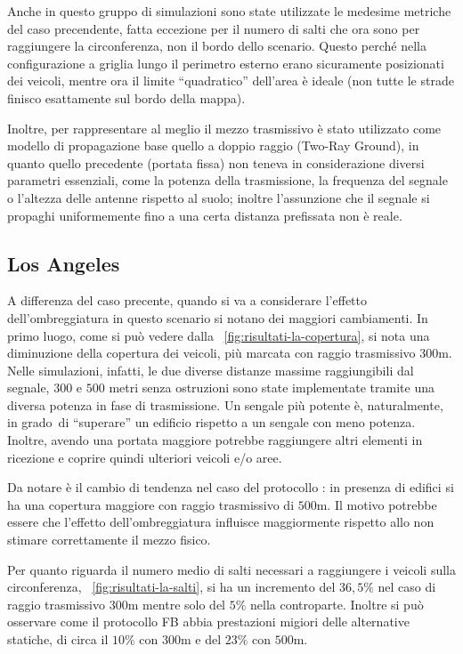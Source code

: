 %
Anche in questo gruppo di simulazioni sono state utilizzate le medesime metriche del caso precendente,
fatta eccezione per il numero di salti che ora sono per raggiungere la circonferenza, non il bordo dello scenario.
Questo perché nella configurazione a griglia lungo il perimetro esterno erano sicuramente posizionati dei veicoli,
mentre ora il limite ``quadratico'' dell'area è ideale (non tutte le strade finisco esattamente sul bordo della mappa).

Inoltre, per rappresentare al meglio il mezzo trasmissivo è stato utilizzato come modello di propagazione base
quello a doppio raggio (Two-Ray Ground), in quanto quello precedente (portata fissa) non teneva in considerazione
diversi parametri essenziali, come la potenza della trasmissione, la frequenza del segnale o l'altezza delle antenne rispetto al suolo;
inoltre l'assunzione che il segnale si propaghi uniformemente fino a una certa distanza prefissata non è reale.
%
\subsection{Los Angeles}\label{subsec:risultati-la}
A differenza del caso precente, quando si va a considerare l'effetto dell'ombreggiatura in questo scenario
si notano dei maggiori cambiamenti.
In primo luogo, come si può vedere dalla \figurename~\ref{fig:risultati-la-copertura},
si nota una diminuzione della copertura dei veicoli, più marcata con raggio trasmissivo $300$m.
Nelle simulazioni, infatti, le due diverse distanze massime raggiungibili dal segnale,
$300$ e $500$ metri senza ostruzioni sono state implementate tramite una diversa potenza in fase di trasmissione.
Un sengale più potente è, naturalmente, in grado di ``superare'' un edificio rispetto a un sengale con meno potenza.
Inoltre, avendo una portata maggiore potrebbe raggiungere altri elementi in ricezione e coprire quindi ulteriori veicoli e/o aree.

Da notare è il cambio di tendenza nel caso del protocollo \statica{}:
in presenza di edifici si ha una copertura maggiore con raggio trasmissivo di $500$m.
Il motivo potrebbe essere che l'effetto dell'ombreggiatura influisce maggiormente rispetto
allo non stimare correttamente il mezzo fisico.

Per quanto riguarda il numero medio di salti necessari a raggiungere i veicoli sulla circonferenza,
\figurename~\ref{fig:risultati-la-salti},
si ha un incremento del $36,5\%$ nel caso di raggio trasmissivo $300$m mentre solo del $5\%$ nella controparte.
Inoltre si può osservare come il protocollo FB abbia prestazioni migiori delle alternative statiche,
di circa il $10\%$ con $300$m e del $23\%$ con $500$m. %

